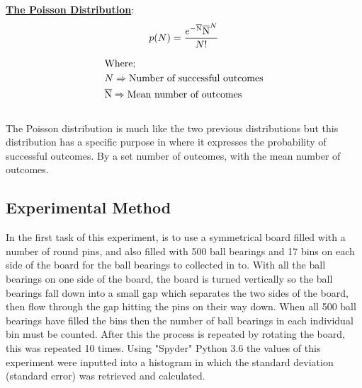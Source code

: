 \documentclass[11pt]{article}
\begin{document}
\bigskip

\underline{\textbf{The Poisson Distribution}}:\\

\begin{equation} \label{The Poisson Distribution Equation}
p(N) = \dfrac{e^{-\overline{\rm N}}\overline{\rm N}^N}{N!}
\end{equation}

\begin{multicols}{2}
\begin{equation*}
\begin{split}
&\text{Where;} \\
&N \Rightarrow \text{Number of successful outcomes} \\
&\overline{\rm N} \Rightarrow \text{Mean number of outcomes} \\
\end{split}
\end{equation*} \\

The Poisson distribution is much like the two previous distributions but this distribution has a specific purpose in where it expresses the probability of successful outcomes. By a set number of outcomes, with the mean number of outcomes.

\end{multicols}

\bigskip


\subsection{Experimental Method}
\label{Experimental Method SubSection}

In the first task of this experiment, is to use a symmetrical board filled with a number of round pins, and also filled with 500 ball bearings and 17 bins on each side of the board for the ball bearings to collected in to. With all the ball bearings on one side of the board, the board is turned vertically so the ball bearings fall down into a small gap which separates the two sides of the board, then flow through the gap hitting the pins on their way down. When all 500 ball bearings have filled the bins then the number of ball bearings in each individual bin must be counted. After this the process is repeated by rotating the board, this was repeated 10 times. Using "Spyder" Python 3.6 the values of this experiment were inputted into a histogram in which the standard deviation (standard error) was retrieved and calculated. \\
\end{document}
